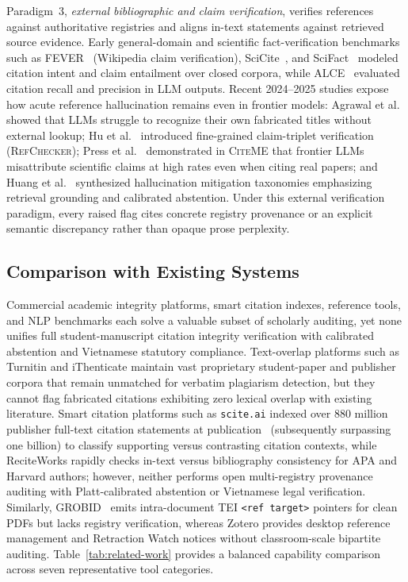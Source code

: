 Paradigm~3, \emph{external bibliographic and claim verification}, verifies references against authoritative registries and aligns in-text statements against retrieved source evidence. Early general-domain and scientific fact-verification benchmarks such as FEVER~\cite{thorne2018fever} (Wikipedia claim verification), SciCite~\cite{cohan2019scicite}, and SciFact~\cite{wadden2020scifact} modeled citation intent and claim entailment over closed corpora, while ALCE~\cite{gao2023alce} evaluated citation recall and precision in LLM outputs. Recent 2024--2025 studies expose how acute reference hallucination remains even in frontier models: Agrawal et al.~\cite{agrawal2024hallucinating} showed that LLMs struggle to recognize their own fabricated titles without external lookup; Hu et al.~\cite{hu2024refchecker} introduced fine-grained claim-triplet verification (\textsc{RefChecker}); Press et al.~\cite{press2024citeme} demonstrated in \textsc{CiteME} that frontier LLMs misattribute scientific claims at high rates even when citing real papers; and Huang et al.~\cite{huang2025hallucination} synthesized hallucination mitigation taxonomies emphasizing retrieval grounding and calibrated abstention. Under this external verification paradigm, every raised flag cites concrete registry provenance or an explicit semantic discrepancy rather than opaque prose perplexity.

\subsection{Comparison with Existing Systems}

Commercial academic integrity platforms, smart citation indexes, reference tools, and NLP benchmarks each solve a valuable subset of scholarly auditing, yet none unifies full student-manuscript citation integrity verification with calibrated abstention and Vietnamese statutory compliance. Text-overlap platforms such as Turnitin and iThenticate maintain vast proprietary student-paper and publisher corpora that remain unmatched for verbatim plagiarism detection, but they cannot flag fabricated citations exhibiting zero lexical overlap with existing literature. Smart citation platforms such as \texttt{scite.ai} indexed over 880 million publisher full-text citation statements at publication~\cite{nicholson2021scite} (subsequently surpassing one billion) to classify supporting versus contrasting citation contexts, while ReciteWorks rapidly checks in-text versus bibliography consistency for APA and Harvard authors; however, neither performs open multi-registry provenance auditing with Platt-calibrated abstention or Vietnamese legal verification. Similarly, GROBID~\cite{Lopez2009} emits intra-document TEI \texttt{<ref target>} pointers for clean PDFs but lacks registry verification, whereas Zotero provides desktop reference management and Retraction Watch notices without classroom-scale bipartite auditing. Table~\ref{tab:related-work} provides a balanced capability comparison across seven representative tool categories.

